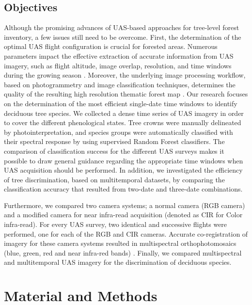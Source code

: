 \documentclass[remotesensing,article,submit,moreauthors,pdftex,12pt,a4paper]{mdpi} %
\begin{document}
\subsection{Objectives}

Although the promising advances of UAS-based approaches for tree-level forest inventory, a few issues still need to be overcome. 
First, the determination of the optimal UAS flight configuration is crucial for forested areas. 
Numerous parameters impact the effective extraction of accurate information from UAS imagery, such as flight altitude, image overlap, resolution, and time windows during the growing season \cite{dandois_high_2013}. 
Moreover, the underlying image processing workflow, based on photogrammetry and image classification techniques, determines the quality of the resulting high resolution thematic forest map \cite{lisein_photogrammetric_2013}.
Our research focuses on the determination of the most efficient single-date time windows to identify deciduous tree species. 
We collected a dense time series of UAS imagery in order to cover the different phenological states. 
Tree crowns were manually delineated by photointerpretation, and species groups were automatically classified with their spectral response by using supervised Random Forest classifiers. 
The comparison of classification success for the different UAS surveys makes it possible to draw general guidance regarding the appropriate time windows when UAS acquisition should be performed. 
In addition, we investigated the efficiency of tree discrimination, based on multitemporal datasets, by comparing the classification accuracy that resulted from two-date and three-date combinations.
 
Furthermore, we compared two camera systems; a normal camera (RGB camera) and a modified camera for near infra-read acquisition (denoted as CIR for Color infra-read). 
For every UAS survey, two identical and successive flights were performed, one for each of the RGB and CIR cameras. 
Accurate co-registration of imagery for these camera systems resulted in multispectral orthophotomosaics (blue, green, red and near infra-red bands) \cite{key_comparison_2001}. 
Finally, we compared multispectral and multitemporal UAS imagery for the discrimination of deciduous species.


 

\section{Material and Methods}
\end{document}
